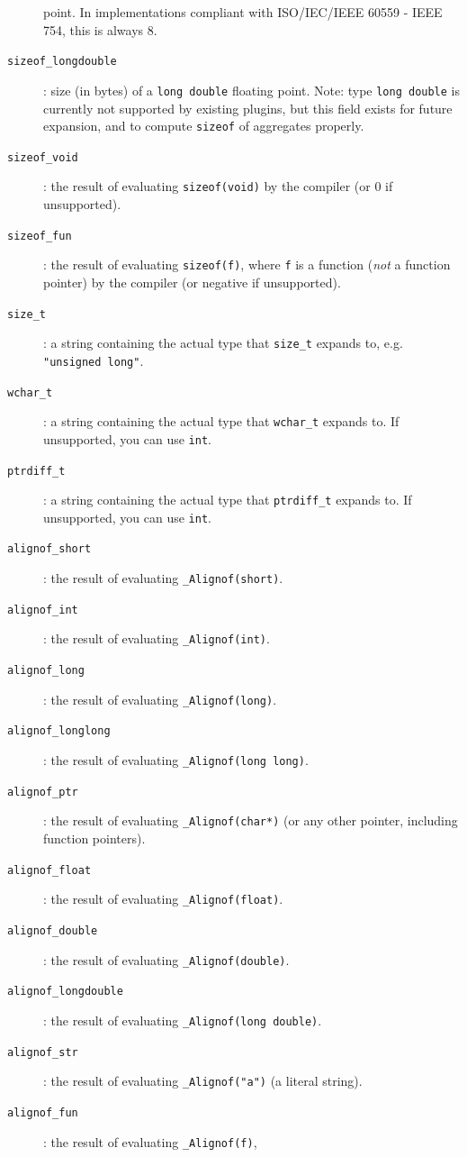 \begin{description}
    point. In implementations compliant with ISO/IEC/IEEE 60559 - IEEE 754,
    this is always 8.
  \item[\texttt{sizeof\_longdouble}]: size (in bytes) of a \verb+long double+
    floating point.
    Note: type \verb+long double+ is currently not supported by existing
    \framac plugins,  but this field exists for future expansion, and
    to compute \verb+sizeof+ of aggregates properly.
  \item[\texttt{sizeof\_void}]: the result of evaluating \verb+sizeof(void)+
    by the compiler (or 0 if unsupported).
  \item[\texttt{sizeof\_fun}]: the result of evaluating \verb+sizeof(f)+, where
    \verb+f+ is a function ({\em not} a function pointer) by the compiler
    (or negative if unsupported).
  \item[\texttt{size\_t}]: a string containing the actual type that
    \verb+size_t+ expands to, e.g. \verb+"unsigned long"+.
  \item[\texttt{wchar\_t}]: a string containing the actual type that
    \verb+wchar_t+ expands to. If unsupported, you can use \verb+int+.
  \item[\texttt{ptrdiff\_t}]: a string containing the actual type that
    \verb+ptrdiff_t+ expands to. If unsupported, you can use \verb+int+.
  \item[\texttt{alignof\_short}]: the result of evaluating
    \verb+_Alignof(short)+.
  \item[\texttt{alignof\_int}]: the result of evaluating \verb+_Alignof(int)+.
  \item[\texttt{alignof\_long}]: the result of evaluating \verb+_Alignof(long)+.
  \item[\texttt{alignof\_longlong}]: the result of evaluating
    \verb+_Alignof(long long)+.
  \item[\texttt{alignof\_ptr}]: the result of evaluating \verb+_Alignof(char*)+
    (or any other pointer, including function pointers).
  \item[\texttt{alignof\_float}]: the result of evaluating
    \verb+_Alignof(float)+.
  \item[\texttt{alignof\_double}]: the result of evaluating
    \verb+_Alignof(double)+.
  \item[\texttt{alignof\_longdouble}]: the result of evaluating
    \verb+_Alignof(long double)+.
  \item[\texttt{alignof\_str}]: the result of evaluating \verb+_Alignof("a")+
    (a literal string).
  \item[\texttt{alignof\_fun}]: the result of evaluating \verb+_Alignof(f)+,

\end{description}
